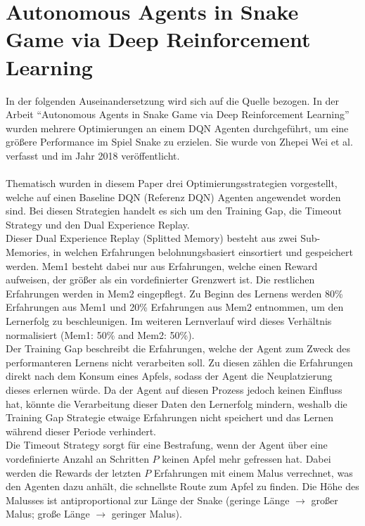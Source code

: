\section{Autonomous Agents in Snake Game via Deep Reinforcement Learning} \label{sec:Verwandte_Arbeiten_Paper_1}
In der folgenden Auseinandersetzung wird sich auf die Quelle \cite{Autonomous_Agents_in_Snake_Game_via_DRL} bezogen.
In der Arbeit "`Autonomous Agents in Snake Game via Deep Reinforcement Learning"' wurden mehrere Optimierungen an einem DQN Agenten durchgeführt, um eine größere Performance im Spiel Snake zu erzielen. Sie wurde von Zhepei Wei et al. verfasst und im Jahr 2018 veröffentlicht.\\
\\Thematisch wurden in diesem Paper drei Optimierungsstrategien vorgestellt, welche auf einen Baseline DQN (Referenz DQN) Agenten angewendet worden sind. Bei diesen Strategien handelt es sich um den Training Gap, die Timeout Strategy und den Dual Experience Replay.\\
Dieser Dual Experience Replay (Splitted Memory) besteht aus zwei Sub-Memories, in welchen Erfahrungen belohnungsbasiert einsortiert und gespeichert werden. Mem1 besteht dabei nur aus Erfahrungen, welche einen Reward aufweisen, der größer als ein vordefinierter Grenzwert ist. Die restlichen Erfahrungen werden in Mem2 eingepflegt. 
Zu Beginn des Lernens werden 80\% Erfahrungen aus Mem1 und 20\% Erfahrungen aus Mem2 entnommen, um den Lernerfolg zu beschleunigen. Im weiteren Lernverlauf wird dieses Verhältnis normalisiert (Mem1: 50\% and Mem2: 50\%).\\
Der Training Gap beschreibt die Erfahrungen, welche der Agent zum Zweck des performanteren Lernens nicht verarbeiten soll. Zu diesen zählen die Erfahrungen direkt nach dem Konsum eines Apfels, sodass der Agent die Neuplatzierung dieses erlernen würde. 
Da der Agent auf diesen Prozess jedoch keinen Einfluss hat, könnte die Verarbeitung dieser Daten den Lernerfolg mindern, weshalb die Training Gap Strategie etwaige Erfahrungen nicht speichert und das Lernen während dieser Periode verhindert.\\
Die Timeout Strategy sorgt für eine Bestrafung, wenn der Agent über eine vordefinierte Anzahl an Schritten $P$ keinen Apfel mehr gefressen hat. Dabei werden die Rewards der letzten $P$ Erfahrungen mit einem Malus verrechnet, was den Agenten dazu anhält, die schnellste Route zum Apfel zu finden. Die Höhe des Malusses ist antiproportional zur Länge der Snake (geringe Länge $\rightarrow$ großer Malus; große Länge $\rightarrow$ geringer Malus).\\
